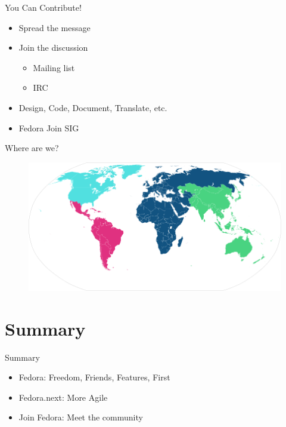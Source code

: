 \documentclass{beamer}
\begin{document}
\begin{frame}{You Can Contribute!}
  \begin{itemize}
    \item Spread the message
    \item Join the discussion
      \begin{itemize}
        \item Mailing list
        \item IRC
      \end{itemize}
    \item Design, Code, Document, Translate, etc.
    \item Fedora Join SIG
  \end{itemize}
\end{frame}

\begin{frame}{Where are we?}
  \begin{figure}[htbp]
    \centering
    \includegraphics[width=\textwidth]{Ambassador-World-Map.png}
  \end{figure}
\end{frame}

\section*{Summary}

\begin{frame}{Summary}
  \begin{itemize}
  \item Fedora: Freedom, Friends, Features, First
  \item Fedora.next: More Agile
  \item Join Fedora: Meet the community
  \end{itemize}
\end{frame}
\end{document}
